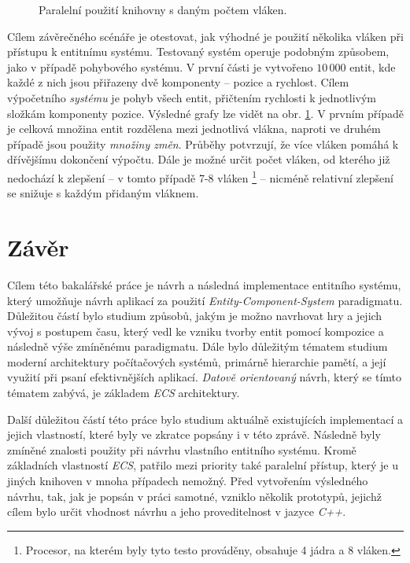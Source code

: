 \begin{figure}[H]
	\begin{center}
	\end{center}
	\caption{Paralelní použití knihovny s daným počtem vláken.}
	\label{Fig:EVALPar}
\end{figure}

Cílem závěrečného scénáře je otestovat, jak výhodné je použití několika vláken při přístupu k entitnímu systému. Testovaný systém operuje podobným způsobem, jako v případě pohybového systému. V první části je vytvořeno $10\,000$ entit, kde každé z nich jsou přiřazeny dvě komponenty -- pozice a rychlost. Cílem výpočetního \emph{systému} je pohyb všech entit, přičtením rychlosti k jednotlivým složkám komponenty pozice. Výsledné grafy lze vidět na obr. \ref{Fig:EVALPar}. V prvním případě je celková množina entit rozdělena mezi jednotlivá vlákna, naproti ve druhém případě jsou použity \emph{množiny změn}. Průběhy potvrzují, že více vláken pomáhá k dřívějšímu dokončení výpočtu. Dále je možné určit počet vláken, od kterého již nedochází k zlepšení -- v tomto případě 7-8 vláken \footnote{Procesor, na kterém byly tyto testo prováděny, obsahuje 4 jádra a 8 vláken.} -- nicméně relativní zlepšení se snižuje s každým přidaným vláknem.

\chapter{Závěr}

Cílem této bakalářské práce je návrh a následná implementace entitního systému, který umožňuje návrh aplikací za použití \emph{Entity-Component-System} paradigmatu. Důležitou částí bylo studium způsobů, jakým je možno navrhovat hry a jejich vývoj s postupem času, který vedl ke vzniku tvorby entit pomocí kompozice a následně výše zmíněnému paradigmatu. Dále bylo důležitým tématem studium moderní architektury počítačových systémů, primárně hierarchie pamětí, a její využití při psaní efektivnějších aplikací. \emph{Datově orientovaný} návrh, který se tímto tématem zabývá, je základem \emph{ECS} architektury.

Další důležitou částí této práce bylo studium aktuálně existujících implementací a jejich vlastností, které byly ve zkratce popsány i v této zprávě. Následně byly zmíněné znalosti použity při návrhu vlastního entitního systému. Kromě základních vlastností \emph{ECS}, patřilo mezi priority také paralelní přístup, který je u jiných knihoven v mnoha případech nemožný. Před vytvořením výsledného návrhu, tak, jak je popsán v práci samotné, vzniklo několik prototypů, jejichž cílem bylo určit vhodnost návrhu a jeho proveditelnost v jazyce \emph{C++}. 

